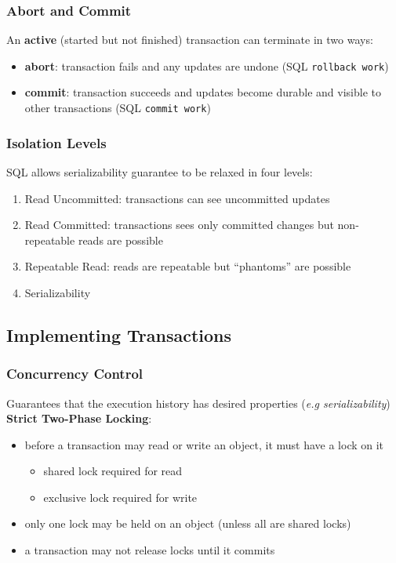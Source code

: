 \documentclass[]{article}
\theoremstyle{definition}
\begin{document}
	\subsubsection{Abort and Commit}
	An \textbf{active} (started but not finished) transaction can terminate in two ways:
	\begin{itemize}
		\item \textbf{abort}: transaction fails and any updates are undone (SQL \lstinline|rollback work|)
		\item \textbf{commit}: transaction succeeds and updates become durable and visible to other transactions (SQL \lstinline|commit work|)
	\end{itemize}

	\subsubsection{Isolation Levels}
	SQL allows serializability guarantee to be relaxed in four levels:
	\begin{enumerate}[start=0]
		\item Read Uncommitted: transactions can see uncommitted updates
		\item Read Committed: transactions sees only committed changes but non-repeatable reads are possible
		\item Repeatable Read: reads are repeatable but ``phantoms'' are possible
		\item Serializability
	\end{enumerate}

	\subsection{Implementing Transactions}
	\subsubsection{Concurrency Control}
	Guarantees that the execution history has desired properties (\textit{e.g serializability}) \\
	
	\textbf{Strict Two-Phase Locking}:
	\begin{itemize}
		\item before a transaction may read or write an object, it must have a lock on it
			\begin{itemize}
				\item shared lock required for read
				\item exclusive lock required for write
			\end{itemize}
		\item only one lock may be held on an object (unless all are shared locks)
		\item a transaction may not release locks until it commits
	\end{itemize}
\end{document}
